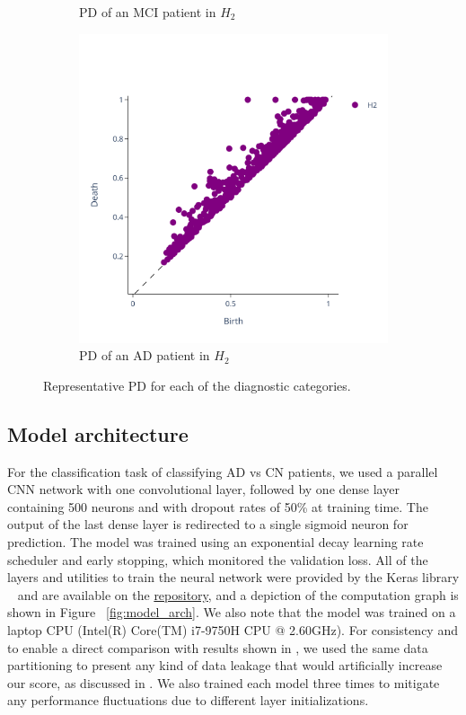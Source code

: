 \documentclass{article}
\begin{document}
\begin{figure}
\begin{subfigure}{0.32\textwidth}
    \caption{PD of an MCI patient in $H_2$}
  \end{subfigure}
  \begin{subfigure}{0.32\textwidth}
    \includegraphics[width=\textwidth]{figures/PDs/persistence_diagram_AD_H_2.png}
    \caption{PD of an AD patient in $H_2$}
  \end{subfigure}
  \caption{Representative PD for each of the diagnostic categories.}
  \label{fig:sample_rep_pd}
\end{figure}


\subsection{Model architecture}\label{sec:model_arch}
For the classification task of classifying AD vs CN patients, we used a parallel
CNN network with one convolutional layer, followed by one dense layer containing 500 neurons and
with dropout rates of 50\% at training time. The output of the last dense layer is redirected to a
single sigmoid neuron for prediction. The model was trained using an exponential decay learning rate
scheduler and early stopping, which monitored the validation loss. All of the layers and utilities
to train the neural network were provided by the Keras library ~\citep{chollet2015keras} and are
available on the \href{https://github.com/pjhartout/TDA_ADNI_MLCB}{repository}, and a depiction of
the computation graph is shown in Figure ~\ref{fig:model_arch}. We also note that the model was
trained on a laptop CPU (Intel(R) Core(TM) i7-9750H CPU @ 2.60GHz). For consistency and to enable a
direct comparison with results shown in \citep{bruningk2020image}, we used the same data
partitioning to present any kind of data leakage that would artificially increase our score, as
discussed in \citep{wen2020convolutional}. We also trained each model three times to mitigate any
performance fluctuations due to different layer initializations.
\end{document}
